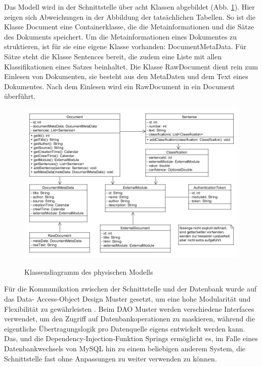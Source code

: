 Das Modell wird in der Schnittstelle über acht Klassen abgebildet (Abb. \ref{uml_model}).
Hier zeigen sich Abweichungen in der Abbildung der tatsächlichen Tabellen. So ist die
Klasse Document eine Containerklasse, die die Metainformationen und die Sätze des
Dokuments speichert. Um die Metainformationen eines Dokumentes zu struktieren, ist für
sie eine eigene Klasse vorhanden: DocumentMetaData. Für Sätze steht die Klasse Sentences
bereit, die zudem eine Liste mit allen Klassifikationen eines Satzes beinhaltet. Die 
Klasse RawDocument dient rein zum Einlesen von Dokumenten, sie besteht aus den MetaDaten 
und dem Text eines Dokumentes. Nach dem Einlesen wird ein RawDocument in ein Document 
überführt.\\

\begin{figure}[h]
	\centering
	\includegraphics[scale=0.5]{content/uml-model.png}
	\label{uml_model}
	\caption{Klassendiagramm des physischen Modells}
\end{figure}

Für die Kommunikation zwischen der Schnittstelle und der Datenbank wurde auf das Data-
Access-Object Design Muster gesetzt, um eine hohe Modularität und Flexibilität zu
gewährleisten \cite{dao-pattern}. Beim DAO Muster werden verschiedene Interfaces
verwendet, um den Zugriff auf Datenbankoperationen zu maskieren, während die eigentliche
Übertragungslogik pro Datenquelle eigens entwickelt werden kann. Das, und die
Dependency-Injection-Funktion Springs ermöglicht es, im Falle eines Datenbankwechsels von
MySQL hin zu einem beliebigen anderem System, die Schnittstelle fast ohne Anpassungen zu
weiter verwenden zu können.

